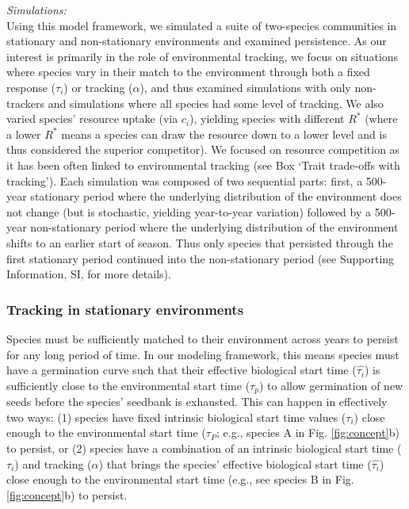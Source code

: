 \documentclass[11pt,letterpaper]{article}
\begin{document}
\noindent \emph{Simulations:}\\
Using this model framework, we simulated a suite of two-species communities in stationary and non-stationary environments and examined persistence. As our interest is primarily in the role of environmental tracking, we focus on situations where species vary in their match to the environment through both a fixed response ($\tau_i$) or tracking ($\alpha$), and thus examined simulations with only non-trackers and simulations where all species had some level of tracking. We also varied species' resource uptake (via $c_i$), yielding species with different $R^*$ (where a lower $R^*$ means a species can draw the resource down to a lower level and is thus considered the superior competitor). We focused on resource competition as it has been often linked to environmental tracking (see Box `Trait trade-offs with tracking'). Each simulation was composed of two sequential parts: first, a 500-year stationary period where the underlying distribution of the environment does not change (but is stochastic, yielding year-to-year variation) followed by a 500-year non-stationary period where the underlying distribution of the environment shifts to an earlier start of season. Thus only species that persisted through the first stationary period continued into the non-stationary period (see Supporting Information, SI, for more details).  %

\subsubsection{Tracking in stationary environments}
Species must be sufficiently matched to their environment across years to persist for any long period of time. In our modeling framework, this means species must have a germination curve such that their effective biological start time ($\hat{\tau_{i}}$) is sufficiently close to the environmental start time ($\tau_{p}$) to allow germination of new seeds before the species' seedbank is exhausted. This can happen in effectively two ways: (1) species have fixed intrinsic biological start time values ($\tau_i$) close enough to the environmental start time ($\tau_P$; e.g., species A in Fig. \ref{fig:concept}b) to persist, or (2) species have a combination of an intrinsic biological start time ($\tau_i$) and tracking ($\alpha$) that brings the species' effective biological start time ($\hat{\tau_{i}}$) close enough to the environmental start time (e.g., see species B in Fig. \ref{fig:concept}b) to persist.  
\end{document}

